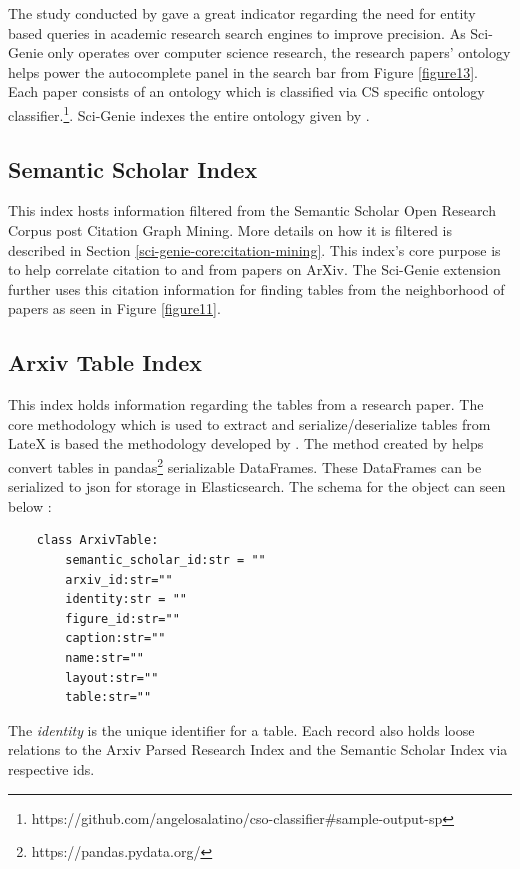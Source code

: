 The study conducted by \cite{li2017investigating} gave a great indicator regarding the need for entity based queries in academic research search engines to improve precision. As Sci-Genie only operates over computer science research, the research papers’ ontology helps power the autocomplete panel in the search bar from Figure \ref{figure13}. Each paper consists of an ontology which is classified via CS specific ontology classifier.\footnote{https://github.com/angelosalatino/cso-classifier\#sample-output-sp}. Sci-Genie indexes the entire ontology given by \cite{salatino2020ontology}. 

\subsection{Semantic Scholar Index}
\label{sci-genie-core:data-layer:ss-index}
This index hosts information filtered from the Semantic Scholar Open Research Corpus\parencite{ammar-etal-2018-construction} post Citation Graph Mining. More details on how it is filtered is described in Section \ref{sci-genie-core:citation-mining}. This index’s core purpose is to help correlate citation to and from papers on ArXiv. The Sci-Genie extension further uses this citation information for finding tables from the neighborhood of papers as seen in Figure \ref{figure11}.


\subsection{Arxiv Table Index}
\label{sci-genie-core:data-layer:table-index}
This index holds information regarding the tables from a research paper. The core methodology which is used to extract and serialize/deserialize tables from LateX is based the methodology developed by \cite{kardas2020axcell}. The method created by  \cite{kardas2020axcell} helps convert tables in pandas\footnote{https://pandas.pydata.org/} serializable DataFrames. These DataFrames can be serialized to json for storage in Elasticsearch. The schema for the object can seen below : 
\begin{verbatim}
    class ArxivTable:
        semantic_scholar_id:str = ""
        arxiv_id:str=""
        identity:str = ""
        figure_id:str=""
        caption:str=""
        name:str=""
        layout:str=""
        table:str=""
\end{verbatim}

The \textit{identity} is the unique identifier for a table. Each record also holds loose relations to the Arxiv Parsed Research Index and the Semantic Scholar Index via respective ids. 

